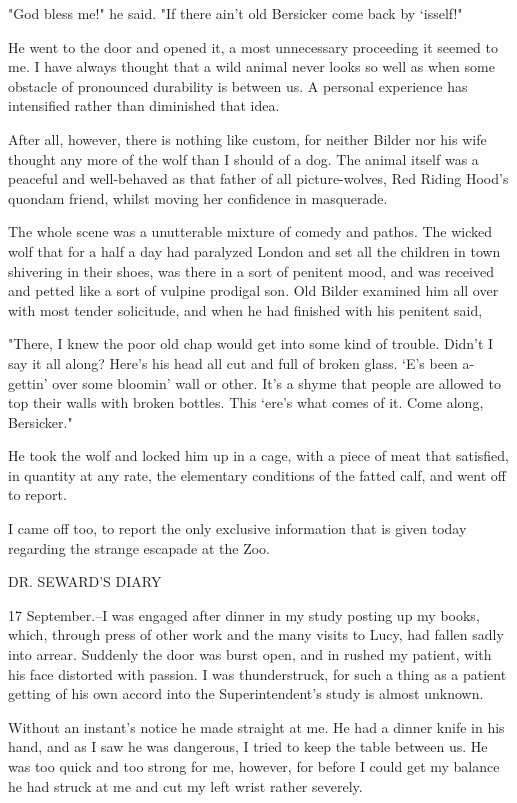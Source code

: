 "God bless me!" he said. "If there ain't old Bersicker come back by `isself!" 

He went to the door and opened it, a most unnecessary proceeding it seemed to me. I have always thought that a wild animal never looks so well as when some obstacle of pronounced durability is between us. A personal experience has intensified rather than diminished that idea. 

After all, however, there is nothing like custom, for neither Bilder nor his wife thought any more of the wolf than I should of a dog. The animal itself was a peaceful and well-behaved as that father of all picture-wolves, Red Riding Hood's quondam friend, whilst moving her confidence in masquerade. 

The whole scene was a unutterable mixture of comedy and pathos. The wicked wolf that for a half a day had paralyzed London and set all the children in town shivering in their shoes, was there in a sort of penitent mood, and was received and petted like a sort of vulpine prodigal son. Old Bilder examined him all over with most tender solicitude, and when he had finished with his penitent said, 

"There, I knew the poor old chap would get into some kind of trouble. Didn't I say it all along? Here's his head all cut and full of broken glass. `E's been a-gettin' over some bloomin' wall or other. It's a shyme that people are allowed to top their walls with broken bottles. This `ere's what comes of it. Come along, Bersicker." 

He took the wolf and locked him up in a cage, with a piece of meat that satisfied, in quantity at any rate, the elementary conditions of the fatted calf, and went off to report. 

I came off too, to report the only exclusive information that is given today regarding the strange escapade at the Zoo. 

DR. SEWARD'S DIARY 

17 September.--I was engaged after dinner in my study posting up my books, which, through press of other work and the many visits to Lucy, had fallen sadly into arrear. Suddenly the door was burst open, and in rushed my patient, with his face distorted with passion. I was thunderstruck, for such a thing as a patient getting of his own accord into the Superintendent's study is almost unknown. 

Without an instant's notice he made straight at me. He had a dinner knife in his hand, and as I saw he was dangerous, I tried to keep the table between us. He was too quick and too strong for me, however, for before I could get my balance he had struck at me and cut my left wrist rather severely. 

